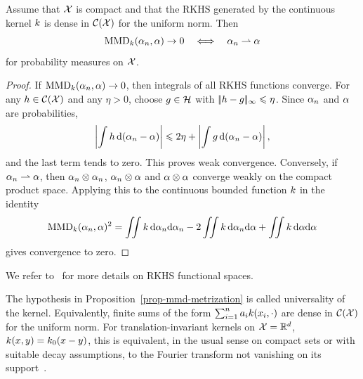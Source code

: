 \begin{prop}\label{prop-mmd-metrization}
	Assume that $\mathcal{X}$ is compact and that the RKHS generated by the continuous kernel $k$ is dense in $\mathcal{C}(\mathcal{X})$ for the uniform norm. Then
	\[
		\operatorname{MMD}_{k}(\alpha_n,\alpha)\to0
		\quad\Longleftrightarrow\quad
		\alpha_n\rightharpoonup\alpha
	\]
	for probability measures on $\mathcal{X}$.
\end{prop}
\begin{proof}
	If $\operatorname{MMD}_{k}(\alpha_n,\alpha)\to0$, then integrals of all RKHS functions converge. For any $h\in\mathcal{C}(\mathcal{X})$ and any $\eta>0$, choose $g\in\mathcal{H}$ with $|\!| h-g |\!|_\infty\leqslant\eta$. Since $\alpha_n$ and $\alpha$ are probabilities,
	\[
		\left|\int h\,\mathrm{d}(\alpha_n-\alpha)\right|
		\leqslant
		2\eta+\left|\int g\,\mathrm{d}(\alpha_n-\alpha)\right|,
	\]
	and the last term tends to zero. This proves weak convergence. Conversely, if $\alpha_n\rightharpoonup\alpha$, then $\alpha_n\otimes\alpha_n$, $\alpha_n\otimes\alpha$ and $\alpha\otimes\alpha$ converge weakly on the compact product space. Applying this to the continuous bounded function $k$ in the identity
	\[
		\MMD_{\Krkhs}(\al_n,\al)^2
\index{maximum mean discrepancy}%
		=
		\iint \Krkhs\,\d\al_n\d\al_n
		-2\iint \Krkhs\,\d\al_n\d\al
		+\iint \Krkhs\,\d\al\d\al
	\]
	gives convergence to zero.
\end{proof}


We refer to~\cite{berlinet03reproducing,Hofmann2008,scholkopf2002learning} for more details on RKHS functional spaces.

\begin{rem}
The hypothesis in Proposition~\ref{prop-mmd-metrization} is called universality of the kernel. Equivalently, finite sums of the form $\sum_{i=1}^n a_i k(x_i,\cdot)$ are dense in $\mathcal{C}(\mathcal{X})$ for the uniform norm. For translation-invariant kernels on $\mathcal{X}=\mathbb{R}^d$, $k(x,y)=k_0(x-y)$, this is equivalent, in the usual sense on compact sets or with suitable decay assumptions, to the Fourier transform not vanishing on its support~\cite{sriperumbudur2008injective,sriperumbudur2012empirical}.
\end{rem}

